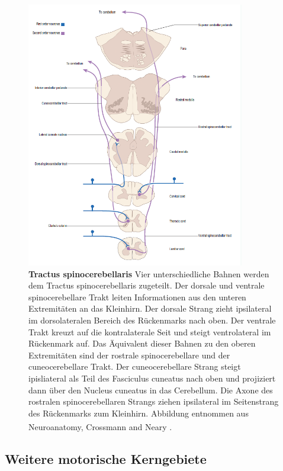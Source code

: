 \documentclass[12pt,a4paper,pdftex]{article}
\begin{document}
\begin{figure}[H]
    \centering
    \includegraphics[width=0.85\textwidth]{pictures/Bilder_Laura/spinocerebellar_tract.PNG}
    \caption[Tractus spinocerebellaris]{\textbf{Tractus spinocerebellaris} Vier unterschiedliche Bahnen werden dem Tractus spinocerebellaris zugeteilt. Der dorsale und ventrale spinocerebellare Trakt leiten Informationen aus den unteren Extremitäten an das Kleinhirn. Der dorsale Strang zieht ipsilateral im dorsolateralen Bereich des Rückenmarks nach oben. Der ventrale Trakt kreuzt auf die kontralaterale Seit und steigt ventrolateral im Rückenmark auf. Das Äquivalent dieser Bahnen zu den oberen Extremitäten sind der rostrale spinocerebellare und der cuneocerebellare Trakt. Der cuneocerebellare Strang steigt ipisliateral als Teil des Fasciculus cuneatus nach oben und projiziert dann über den Nucleus cuneatus in das Cerebellum. Die Axone des rostralen spinocerebellaren Strangs ziehen ipsilateral im Seitenstrang des Rückenmarks zum Kleinhirn. Abbildung entnommen aus Neuroanatomy, Crossmann and Neary \textsuperscript{\cite[8]{crossman2014neuroanatomy}}.}
    \label{fig:tr_spinocerebellaris}
\end{figure}

\subsection{Weitere motorische Kerngebiete}
\end{document}
